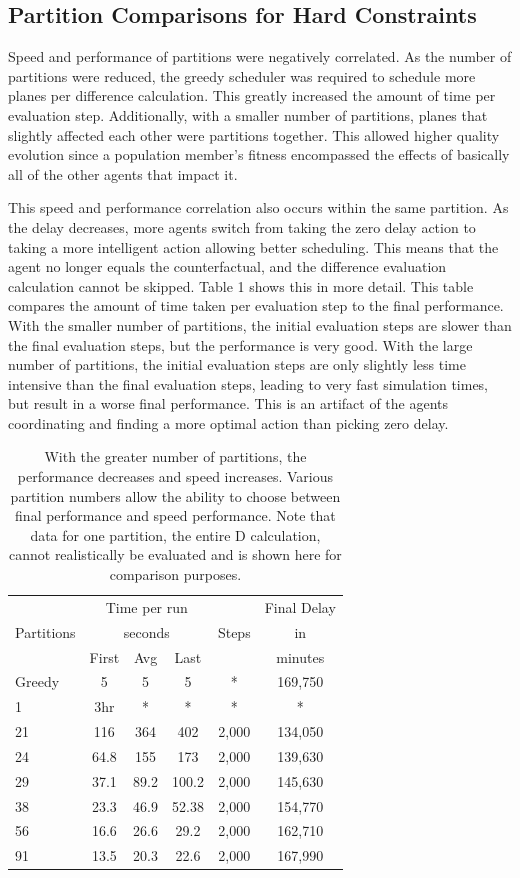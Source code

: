 \documentclass{sig-alternate}
\begin{document}
\subsection{Partition Comparisons for Hard Constraints}
Speed and performance of partitions were negatively correlated. As the number of partitions were reduced, the greedy scheduler was required to schedule more planes per difference calculation. This greatly increased the amount of time per evaluation step. Additionally, with a smaller number of partitions, planes that slightly affected each other were partitions together. This allowed higher quality evolution since a population member's fitness encompassed the effects of basically all of the other agents that impact it. 

This speed and performance correlation also occurs within the same partition. As the delay decreases, more agents switch from taking the zero delay action to taking a more intelligent action allowing better scheduling. This means that the agent no longer equals the counterfactual, and the difference evaluation calculation cannot be skipped. Table 1 shows this in more detail. This table compares the amount of time taken per evaluation step to the final performance. With the smaller number of partitions, the initial evaluation steps are slower than the final evaluation steps, but the performance is very good. With the large number of partitions, the initial evaluation steps are only slightly less time intensive than the final evaluation steps, leading to very fast simulation times, but result in a worse final performance. This is an artifact of the agents coordinating and finding a more optimal action than picking zero delay.

\begin{table}[tbh!]
\begin{tabular}{|l|c|c|c|c|c|}
\hline
& \multicolumn{3}{|c|}{Time per run} & &Final Delay\\
Partitions & \multicolumn{3}{|c|}{seconds} &Steps&in\\
&First&Avg&Last&&minutes\\
\hline
Greedy & 5 & 5 & 5 & * & 169,750 \\
\hline
1 & 3hr & * & * & * &* \\
\hline
21 & 116 & 364 & 402 & 2,000 & 134,050\\
\hline
24 & 64.8 & 155 & 173 & 2,000 & 139,630\\
\hline
29 & 37.1 & 89.2 & 100.2 & 2,000 & 145,630\\
\hline
38 & 23.3 & 46.9 & 52.38 & 2,000 & 154,770\\
\hline
56 & 16.6 & 26.6 & 29.2 & 2,000 & 162,710\\
\hline
91 & 13.5 & 20.3 & 22.6 & 2,000 & 167,990\\
\hline
\end{tabular}
\caption{With the greater number of partitions, the performance decreases and speed increases. Various partition numbers allow the ability to choose between final performance and speed performance. Note that data for one partition, the entire D calculation, cannot realistically be evaluated and is shown here for comparison purposes.}
\label{TimingTable}
\end{table}
\end{document}
